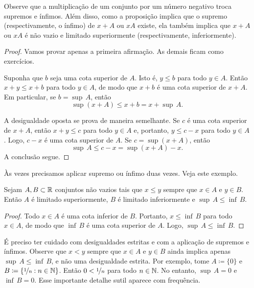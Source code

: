 Observe que a multiplicação de um conjunto por um número negativo troca supremos e ínfimos.
Além disso, como a proposição implica que
o supremo (respectivamente, o ínfimo) de $x+A$ ou $xA$ existe,
ela também implica que $x+A$ ou $xA$
é não vazio e limitado superiormente (respectivamente, inferiormente).

\begin{proof}
Vamos provar apenas a primeira afirmação. As demais ficam como exercícios.

Suponha que $b$ seja uma cota superior de $A$. Isto é, $y \leq b$ para todo $y \in A$.
Então $x+y \leq x+b$ para todo $y \in A$, de modo que $x+b$ é uma cota
superior de $x+A$. Em particular, se $b = \sup\, A$, então
\begin{equation*}
\sup (x+A) \leq x+b = x+ \sup\, A .
\end{equation*}

A desigualdade oposta se prova de maneira semelhante. Se $c$ é uma cota superior de $x+A$,
então $x+y \leq c$
para todo $y \in A$ e, portanto, $y \leq c-x$ para todo $y \in A$.
Logo, $c-x$ é uma cota superior de $A$.
Se $c = \sup (x+A)$, então
\begin{equation*}
\sup\, A \leq c-x = \sup (x+A) -x .
\end{equation*}
A conclusão segue.
\end{proof}

Às vezes precisamos aplicar supremo ou ínfimo duas vezes. Veja este exemplo.

\begin{prop} \label{infsupineq:prop}
Sejam $A, B \subset {\mathbb{R}}$ conjuntos não vazios tais que $x \leq y$ sempre que $x \in A$ e
$y \in B$. Então $A$ é limitado superiormente, $B$ é limitado inferiormente e $\sup\, A \leq \inf\, B$.
\end{prop}

\begin{proof}
Todo $x \in A$ é uma cota inferior de $B$.
Portanto, $x \leq \inf\, B$ para todo $x \in A$,
de modo que $\inf\, B$ é uma cota superior de $A$.
Logo, $\sup\, A \leq \inf\, B$.
\end{proof}

É preciso ter cuidado com desigualdades estritas e com a aplicação de supremos e ínfimos.
Observe que $x < y$ sempre que $x \in A$ e
$y \in B$ ainda implica apenas $\sup\, A \leq \inf\, B$, e não uma desigualdade
estrita.
Por exemplo, tome $A \coloneqq \{ 0 \}$ e $B \coloneqq \{ \nicefrac{1}{n}
: n \in {\mathbb{N}} \}$.
Então $0 < \nicefrac{1}{n}$
para todo $n \in {\mathbb{N}}$. No entanto, $\sup\, A = 0$ e $\inf\, B = 0$.
Esse importante detalhe sutil aparece com frequência.

